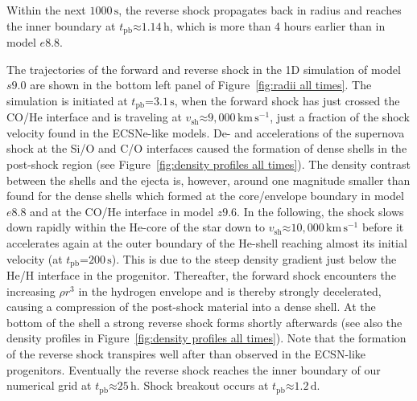 \documentclass[fleqn,usenatbib]{mnras}
\newcommand{\tpb}{\ensuremath{t_{\text{pb}}}}
\newcommand{\kms}{\ensuremath{\mathrm{km\, s^{-1}}}}
\newcommand{\s}{\ensuremath{\text{s}}}
\begin{document}
Within the next $1000\,\s$, the reverse shock propagates back in radius and reaches the inner boundary
at $\tpb \mathord{\approx} 1.14\,\text{h}$, which is more than 4 hours earlier than in model $e8.8$. 

The trajectories of the forward and reverse shock in the 1D simulation of model $s9.0$ 
are shown in the bottom left panel of Figure~\ref{fig:radii all times}. 
The simulation is initiated at $\tpb\mathord{=}3.1\,\s$, when the forward shock has just crossed the CO/He interface
and is traveling at $v_{\mathrm{sh}}\mathord{\approx} 9,000\,\kms$, just a fraction of the shock
velocity found in the ECSNe-like models. De- and accelerations of the supernova shock at the Si/O and 
C/O interfaces caused the formation of dense shells in the 
post-shock region (see Figure~\ref{fig:density profiles all times}).
The density contrast between the shells and the ejecta is,
however, around one magnitude smaller than found for the dense shells which formed at the core/envelope
boundary in model $e8.8$ and at the CO/He interface in model $z9.6$. 
In the following, the shock slows down rapidly within the He-core of the star down to 
$v_{\mathrm{sh}}\mathord{\approx}10,000\,\kms$ before it accelerates again at the outer
boundary of the He-shell reaching almost its initial velocity (at $\tpb\mathord{=}200\,\s$).
This is due to 
the steep density gradient just below the He/H interface in the progenitor. 
Thereafter, the forward shock encounters the increasing $\rho r^3$ in the hydrogen envelope and is 
thereby strongly decelerated, causing a compression of the post-shock material into a dense shell. 
At the bottom of the shell a strong reverse shock forms shortly afterwards (see also the density profiles 
in Figure~\ref{fig:density profiles all times}). Note that the formation of the reverse shock transpires 
well after than observed in the ECSN-like progenitors. 
Eventually the reverse shock reaches the inner boundary of our numerical grid at 
$\tpb\mathord{\approx}25\,\mathrm{h}$. Shock breakout occurs at $\tpb\mathord{\approx}1.2\,\mathrm{d}$.
\end{document}
